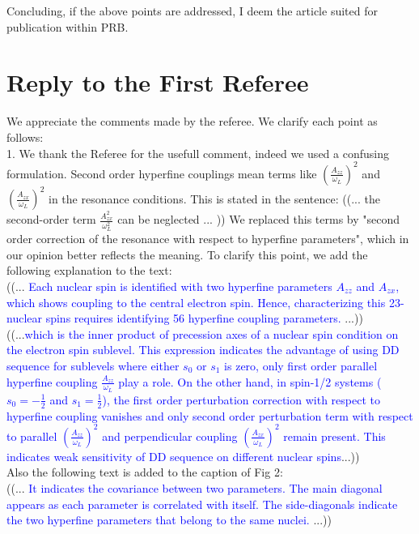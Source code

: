 \documentclass[12pt]{amsart}
\begin{document}
	Concluding, if the above points are addressed, I deem the article
	suited for publication within PRB.
	
	\color{black} \section*{Reply to the First Referee}
	We appreciate the comments made by the referee. We clarify each point as follows:\\
	
	1. We thank the Referee for the usefull comment, indeed we used a confusing  formulation. Second order hyperfine couplings mean terms like $(\frac{A_{zz}}{\omega_L})^2$ and $(\frac{A_{zx}}{\omega_L})^2$ in the resonance conditions. This is stated in the sentence:
	((... the second-order term $\frac{A_{zx}^2}{\omega_L^2}$ can be neglected ... ))
	We replaced this terms by "second order correction of the resonance with respect to hyperfine parameters", which in our opinion better reflects the meaning. 
	To clarify this point, we add the following explanation to the text:\\
	((... \textcolor{blue}{Each nuclear spin is identified with two hyperfine parameters $A_{zz}$ and $A_{zx}$, which shows coupling to the central electron spin. Hence, characterizing this 23-nuclear spins requires identifying 56 hyperfine coupling parameters.} ...)) \\
	
	((...\textcolor{blue}{which is the inner product of precession axes of a nuclear spin condition on the electron spin sublevel. This expression indicates the advantage of using DD sequence for sublevels where either $s_0$ or $s_1$ is zero, only first order parallel hyperfine coupling $\frac{A_{zz}}{\omega_L}$ play a role. On the other hand, in spin-1/2 systems ($s_0=-\frac{1}{2}$ and $s_1=\frac{1}{2}$), the first order perturbation correction with respect to hyperfine coupling vanishes and only second order perturbation term with respect to parallel $(\frac{A_{zz}}{\omega_L})^2$  and perpendicular coupling $(\frac{A_{zx}}{\omega_L})^2$ remain present. This indicates weak sensitivity of DD sequence on different nuclear spins}...))\\
	
	Also the following text is added to the caption of Fig 2:\\
	((... \textcolor{blue}{It indicates the covariance between two parameters. The main diagonal appears as each parameter is correlated with itself. The side-diagonals indicate the two hyperfine parameters that belong to the same nuclei.} ...)) \\
	
\end{document}

